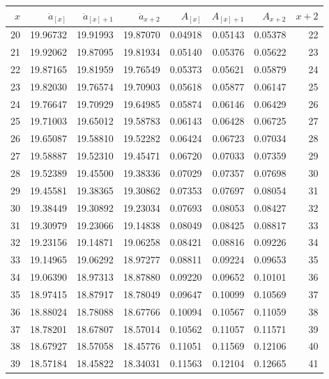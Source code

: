\documentclass[12pt]{article}
\begin{document}
\begin{longtable}{rrrrrrrr}
  \hline
$x$ & $\ddot{a}_{[x]}$ & $\ddot{a}_{[x]+1}$ & $\ddot{a}_{x+2}$ & $A_{[x]}$ & $A_{[x]+1}$ & $A_{x+2}$ & $x+2$ \\ 
  \hline \endhead 20 & 19.96732 & 19.91993 & 19.87070 & 0.04918 & 0.05143 & 0.05378 & 22 \\ 
  21 & 19.92062 & 19.87095 & 19.81934 & 0.05140 & 0.05376 & 0.05622 & 23 \\ 
  22 & 19.87165 & 19.81959 & 19.76549 & 0.05373 & 0.05621 & 0.05879 & 24 \\ 
  23 & 19.82030 & 19.76574 & 19.70903 & 0.05618 & 0.05877 & 0.06147 & 25 \\ 
  24 & 19.76647 & 19.70929 & 19.64985 & 0.05874 & 0.06146 & 0.06429 & 26 \\ 
  25 & 19.71003 & 19.65012 & 19.58783 & 0.06143 & 0.06428 & 0.06725 & 27 \\ 
  26 & 19.65087 & 19.58810 & 19.52282 & 0.06424 & 0.06723 & 0.07034 & 28 \\ 
  27 & 19.58887 & 19.52310 & 19.45471 & 0.06720 & 0.07033 & 0.07359 & 29 \\ 
  28 & 19.52389 & 19.45500 & 19.38336 & 0.07029 & 0.07357 & 0.07698 & 30 \\ 
  29 & 19.45581 & 19.38365 & 19.30862 & 0.07353 & 0.07697 & 0.08054 & 31 \\ 
  30 & 19.38449 & 19.30892 & 19.23034 & 0.07693 & 0.08053 & 0.08427 & 32 \\ 
  31 & 19.30979 & 19.23066 & 19.14838 & 0.08049 & 0.08425 & 0.08817 & 33 \\ 
  32 & 19.23156 & 19.14871 & 19.06258 & 0.08421 & 0.08816 & 0.09226 & 34 \\ 
  33 & 19.14965 & 19.06292 & 18.97277 & 0.08811 & 0.09224 & 0.09653 & 35 \\ 
  34 & 19.06390 & 18.97313 & 18.87880 & 0.09220 & 0.09652 & 0.10101 & 36 \\ 
  35 & 18.97415 & 18.87917 & 18.78049 & 0.09647 & 0.10099 & 0.10569 & 37 \\ 
  36 & 18.88024 & 18.78088 & 18.67766 & 0.10094 & 0.10567 & 0.11059 & 38 \\ 
  37 & 18.78201 & 18.67807 & 18.57014 & 0.10562 & 0.11057 & 0.11571 & 39 \\ 
  38 & 18.67927 & 18.57058 & 18.45776 & 0.11051 & 0.11569 & 0.12106 & 40 \\ 
  39 & 18.57184 & 18.45822 & 18.34031 & 0.11563 & 0.12104 & 0.12665 & 41 \\ 

\end{longtable}
\end{document}
